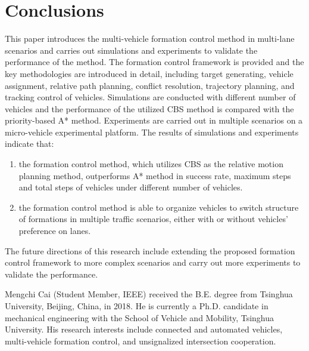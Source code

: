 \documentclass[journal]{IEEEtranTIE}
\begin{document}
%
\section{Conclusions}
\label{conc}
%

This paper introduces the multi-vehicle formation control method in multi-lane scenarios and carries out simulations and experiments to validate the performance of the method. The formation control framework is provided and the key methodologies are introduced in detail, including target generating, vehicle assignment, relative path planning, conflict resolution, trajectory planning, and tracking control of vehicles. Simulations are conducted with different number of vehicles and the performance of the utilized CBS method is compared with the priority-based A* method. Experiments are carried out in multiple scenarios on a micro-vehicle experimental platform. The results of simulations and experiments indicate that:
\begin{enumerate}
\item the formation control method, which utilizes CBS as the relative motion planning method, outperforms A* method in success rate, maximum steps and total steps of vehicles under different number of vehicles.
\item the formation control method is able to organize vehicles to switch structure of formations in multiple traffic scenarios, either with or without vehicles' preference on lanes.
\end{enumerate}

The future directions of this research include extending the proposed formation control framework to more complex scenarios and carry out more experiments to validate the performance.











\begin{IEEEbiography}
	{Mengchi Cai} (Student Member, IEEE) received the B.E. degree from Tsinghua University, Beijing, China, in 2018. He is currently a Ph.D. candidate in mechanical engineering with the School of Vehicle and Mobility, Tsinghua University. His research interests include connected and automated vehicles, multi-vehicle formation control, and unsignalized intersection cooperation. 
\end{IEEEbiography}
\end{document}
